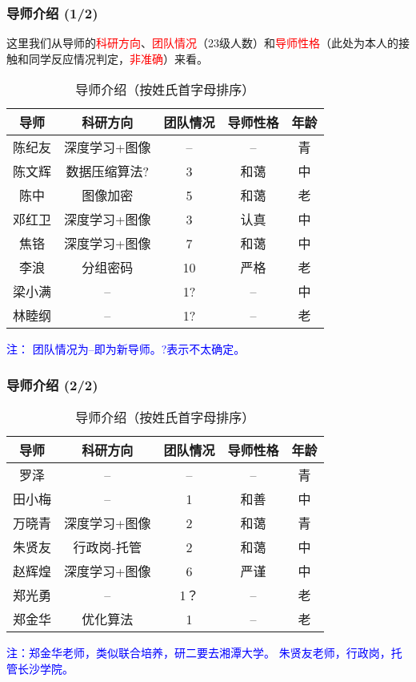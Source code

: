 \documentclass[slide]{../custom}
\begin{document}
\begin{frame}
  \frametitle{导师介绍 (1/2)}
  这里我们从导师的\textcolor{red}{科研方向}、\textcolor{red}{团队情况}（23级人数）和\textcolor{red}{导师性格}（此处为本人的接触和同学反应情况判定，\textcolor{red}{非准确}）来看。

  \begin{table}[htbp]
    \centering
    \caption{导师介绍（按姓氏首字母排序）}
    \begin{tabular}{ccccc}
      \toprule
      导师 & 科研方向 & 团队情况 & 导师性格 & 年龄 \\
      \midrule
      陈纪友 & 深度学习+图像 & -- & -- & 青 \\
      陈文辉 & 数据压缩算法? & 3 & 和蔼 & 中 \\
      陈中 & 图像加密 & 5 & 和蔼 & 老 \\
      邓红卫 & 深度学习+图像 & 3 & 认真 & 中\\
      焦铬 & 深度学习+图像 & 7 & 和蔼 & 中 \\
      李浪 & 分组密码 & 10 & 严格 & 老 \\
      梁小满 & -- & 1? & -- & 中 \\
      林睦纲 & -- & 1? & -- & 老 \\
      \bottomrule
    \end{tabular}
    \label{tab:导师介绍1}
  \end{table}
  \footnotesize{\textcolor{blue}{注： 团队情况为--即为新导师。?表示不太确定。}}
\end{frame}

\begin{frame}
  \frametitle{导师介绍 (2/2)}
  \begin{table}[htbp]
    \centering
    \caption{导师介绍（按姓氏首字母排序）}
    \begin{tabular}{ccccc}
      \toprule
      导师 & 科研方向 & 团队情况 & 导师性格 & 年龄 \\
      \midrule
      罗泽 & -- & -- & -- & 青 \\
      田小梅 & -- & 1 & 和善 & 中 \\
      万晓青 & 深度学习+图像 & 2 & 和蔼 & 青 \\
      朱贤友 & 行政岗-托管 & 2 & 和蔼 & 中 \\
      赵辉煌 & 深度学习+图像 & 6 & 严谨 & 中 \\
      郑光勇 & -- & 1？ & -- & 老 \\
      郑金华 & 优化算法 & 1 & -- & 老 \\
      \bottomrule
    \end{tabular}
    \label{tab:导师介绍2}
  \end{table}
  \footnotesize{\textcolor{blue}{注：郑金华老师，类似联合培养，研二要去湘潭大学。 朱贤友老师，行政岗，托管长沙学院。}}
\end{frame}
\end{document}
